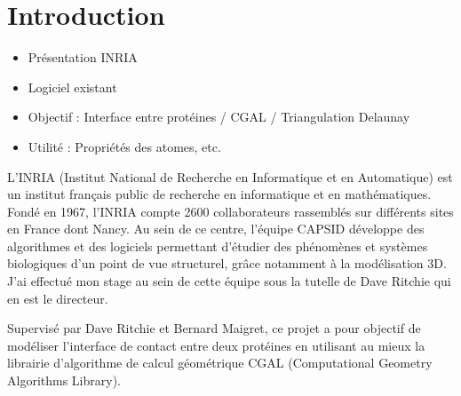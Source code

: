 \chapter*{Introduction}

\begin{itemize}
  \item Présentation INRIA
  \item Logiciel existant
  \item Objectif : Interface entre protéines / CGAL / Triangulation Delaunay
  \item Utilité : Propriétés des atomes, etc.
\end{itemize}

  L'INRIA (Institut National de Recherche en Informatique et en Automatique) est un
  institut français public de recherche en informatique et en mathématiques. Fondé
  en 1967, l'INRIA compte 2600 collaborateurs rassemblés sur différents sites en
  France dont Nancy. Au sein de ce centre, l'équipe CAPSID développe des algorithmes
  et des logiciels permettant d'étudier des phénomènes et systèmes biologiques
  d'un point de vue structurel, grâce notamment à la modélisation 3D. J'ai effectué
  mon stage au sein de cette équipe sous la tutelle de Dave Ritchie qui en est le
  directeur.

  Supervisé par Dave Ritchie et Bernard Maigret, ce projet a pour objectif de
  modéliser l'interface de contact entre deux protéines en utilisant au mieux
  la librairie d'algorithme de calcul géométrique CGAL (Computational Geometry
  Algorithms Library).
  
